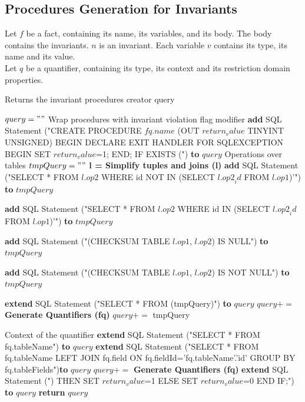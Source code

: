 \documentclass[oneside]{book}
\begin{document}
\newpage

\subsection{Procedures Generation for Invariants}

Let $f$ be a fact, containing its name, its variables, and its body. The body contains the invariants. $n$ is an invariant. Each variable $v$ contains its type, its name and its value.\\
Let $q$ be a quantifier, containing its type, its context and its restriction domain properties.

\begin{algorithm}
\caption{Returns the invariant procedures creator query}
\label{array-sum4}
\begin{algorithmic}[1]
	\State $query = ""$
		\Comment Wrap procedures with invariant violation flag modifier
		\State \textbf{add} SQL Statement ("CREATE PROCEDURE $fq.name$ (OUT $return_value$ TINYINT UNSIGNED) BEGIN DECLARE EXIT HANDLER FOR SQLEXCEPTION BEGIN SET $return_value$=1; END; IF EXISTS (") \textbf{to} $query$
			 \Comment Operations over tables
				\State $tmpQuery = ""$
				\State \textbf{l = Simplify tuples and joins (l)}
				 \State \textbf{add} SQL Statement ("SELECT * FROM $l.op2$ WHERE id NOT IN (SELECT ${l.op2}_id$ FROM $l.op1$)'") \textbf{to} $tmpQuery$
			
				 \State \textbf{add} SQL Statement ("SELECT * FROM $l.op2$ WHERE id IN (SELECT ${l.op2}_id$ FROM $l.op1$)'") \textbf{to} $tmpQuery$
			
				 \State \textbf{add} SQL Statement ("(CHECKSUM TABLE $l.op1$, $l.op2$) IS NULL") \textbf{to} $tmpQuery$
				
				 \State \textbf{add} SQL Statement ("(CHECKSUM TABLE $l.op1$, $l.op2$) IS NOT NULL") \textbf{to} $tmpQuery$
			
				\EndIf
			\EndFor
			 \State \textbf{extend} SQL Statement ("SELECT * FROM (tmpQuery)") \textbf{to} $query$
			\State $query+=$ \textbf{Generate Quantifiers (fq)}
			\Else
				\State $query+=$ tmpQuery
			\EndIf
			
		\Comment Context of the quantifier
			 \State \textbf{extend} SQL Statement ("SELECT * FROM fq.tableName") \textbf{to} $query$
				\State \textbf{extend} SQL Statement ("SELECT * FROM fq.tableName LEFT JOIN fq.field ON fq.fieldId='fq.tableName'.'id' GROUP BY fq.tableFields")\textbf{to} $query$
			\EndIf
			\State $query+=$ \textbf{Generate Quantifiers (fq)}
		\EndIf
		\State \textbf{extend} SQL Statement (") THEN SET $return_value$=1 ELSE SET $return_value$=0 END IF;") \textbf{to} $query$
	\EndFor
	\State \textbf{return} $query$
\EndFunction
\end{algorithmic}


\end{algorithm}
\end{document}
